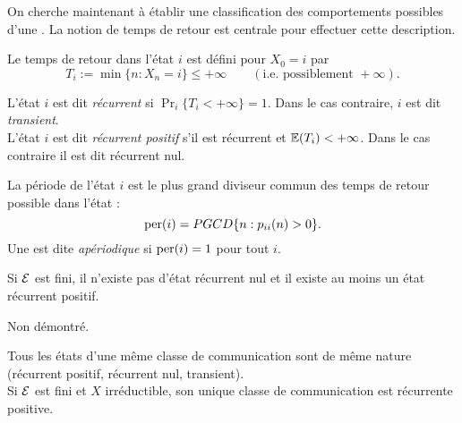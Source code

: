
On cherche maintenant à établir une classification des comportements possibles d'une \cM. La notion de temps de retour est centrale pour effectuer cette description.

\begin{definition}
  Le temps de retour dans l'état $i$ est défini pour $X_0 = i$ par
  $$
  T_i := \min\{n : X_n = i\} \leq + \infty \qquad (\text{i.e. possiblement } + \infty).
  $$
\end{definition}

\begin{definition}
  L'état $i$ est dit {\em récurrent} si $\Pr_i\{T_i < + \infty\} = 1$. Dans le cas contraire, $i$ est dit {\em transient}. \\
  L'état $i$ est dit {\em récurrent positif} s'il est récurrent et $\operatorname{\mathbb{E}}(T_i) < + \infty$. Dans le cas contraire il est dit récurrent nul.
\end{definition}


\begin{definition}
  La période de l'état $i$ est le plus grand diviseur commun des temps de retour possible dans l'état :
  $$
  \text{per}(i) = PGCD\{n: p_{ii}(n) > 0\}.
  $$
  Une \cM est dite {\em apériodique} si $\text{per}(i) = 1$ pour tout $i$.
\end{definition}


\begin{proposition}
  Si $\mathcal{E}$ est fini, il n'existe pas d'état récurrent nul et il existe au moins un état récurrent positif.
\end{proposition}

\proof Non démontré. \eproof

\begin{proposition}
  Tous les états d'une même classe de communication sont de même nature (récurrent positif, récurrent nul, transient). \\
  Si $\mathcal{E}$ est fini et $X$ irréductible, son unique classe de communication est récurrente positive.
\end{proposition}

